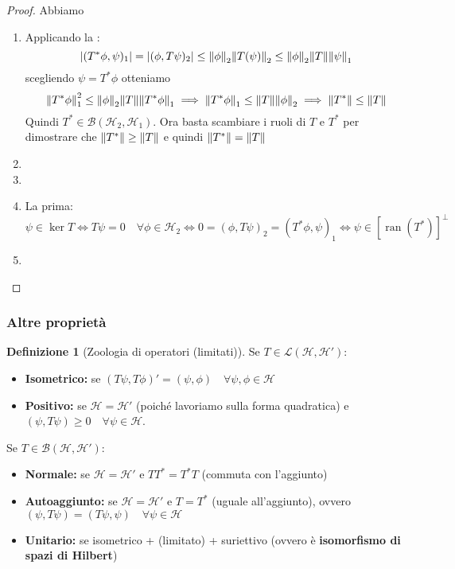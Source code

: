 \documentclass[a4paper,10pt]{article}
\theoremstyle{definition}
\DeclareMathOperator*{\ran}{ran}
\newcommand{\hil}{\mathcal{H}} %
\theoremstyle{indentdefinition}
\newtheorem{defn}{Definizione}[section]
\theoremstyle{indenttheorem}
\theoremstyle{myremark}
\theoremstyle{indentgeneral}
\begin{document}
\begin{proof}
    Abbiamo
    \begin{enumerate}
        \item Applicando la :
        $$\abs{(T^*\phi,\psi)_1}=\abs{(\phi,T\psi)_2}\le \norm{\phi}_2\norm{T(\psi)}_2\le \norm{\phi}_2\norm{T}\norm{\psi}_1$$
        scegliendo $\psi=T^*\phi$ otteniamo 
        $$\norm{T^*\phi}_1^2\le \norm{\phi}_2\norm{T}\norm{T^*\phi}_1\implies\norm{T^*\phi}_1\le \norm{T}\norm{\phi}_2\implies \norm{T^*}\le\norm{T}$$
        Quindi $T^*\in\mathcal{B}(\hil_2,\hil_1)$. Ora basta scambiare i ruoli di $T$ e $T^*$ per dimostrare che $\norm{T^*}\ge\norm{T}$ e quindi $\norm{T^*}=\norm{T}$
        \item \todo{}
        \item 
        \item  La prima: 
        $$\psi\in\ker T\iff T\psi=0\quad \forall\phi\in\hil_2\iff 0=(\phi,T\psi)_2=(T^*\phi,\psi)_1\iff\psi\in[\ran(T^*)]^\perp$$
        \item 
        
    \end{enumerate}
\end{proof}

\subsubsection{Altre proprietà}
\begin{defn}[Zoologia di operatori (limitati)] Se $T\in\mathcal{L}(\hil,\hil')$:
\begin{itemize}
    \item \textbf{Isometrico:} se $(T\psi,T\phi)'=(\psi,\phi)\quad\forall\psi,\phi\in\hil$
    \item \textbf{Positivo:} se $\hil=\hil'$ (poiché lavoriamo sulla forma quadratica) e $(\psi,T\psi)\ge0\quad\forall\psi\in\hil$.
\end{itemize}
    Se $T\in\mathcal{B}(\hil,\hil')$:
\begin{itemize}
    \item \textbf{Normale:} se $\hil=\hil'$ e $TT^*=T^*T$ (commuta con l'aggiunto)
    \item \textbf{Autoaggiunto:} se $\hil=\hil'$ e $T=T^*$ (uguale all'aggiunto), ovvero $(\psi,T\psi)=(T\psi,\psi)\quad\forall\psi\in\hil$
    \item \textbf{Unitario:} se isometrico + (limitato)  + suriettivo (ovvero è \textbf{isomorfismo di spazi di Hilbert})
\end{itemize}
\end{defn}
\end{document}
